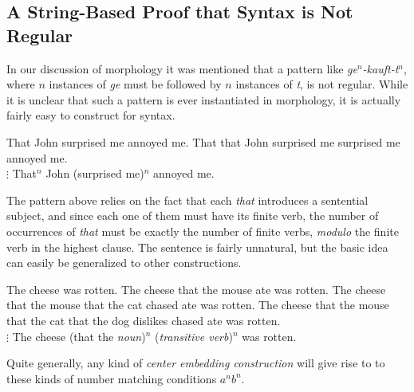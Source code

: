 \subsection{A String-Based Proof that Syntax is Not Regular}
In our discussion of morphology it was mentioned that a pattern like \emph{ge$^n$-kauft-t$^n$}, where $n$ instances of \emph{ge} must be followed by $n$ instances of \emph{t}, is not regular.
While it is unclear that such a pattern is ever instantiated in morphology, it is actually fairly easy to construct for syntax.
%
\begin{exe}
    \ex
    \begin{xlist}
        \ex That John surprised me annoyed me.
        \ex That that John surprised me surprised me annoyed me.\\
        $\vdots$
        \ex That$^n$ John (surprised me)$^n$ annoyed me.
    \end{xlist}
\end{exe}
%
The pattern above relies on the fact that each \emph{that} introduces a sentential subject, and since each one of them must have its finite verb, the number of occurrences of \emph{that} must be exactly the number of finite verbs, \emph{modulo} the finite verb in the highest clause.
The sentence is fairly unnatural, but the basic idea can easily be generalized to other constructions.
%
\begin{exe}
    \ex
    \begin{xlist}
        \ex The cheese was rotten.
        \ex The cheese that the mouse ate was rotten.
        \ex The cheese that the mouse that the cat chased ate was rotten.
        \ex The cheese that the mouse that the cat that the dog dislikes chased ate was rotten.\\
        $\vdots$
        \ex The cheese (that the \emph{noun})$^n$ (\emph{transitive verb})$^n$ was rotten.
    \end{xlist}
\end{exe}
%
Quite generally, any kind of \emph{center embedding construction} will give rise to to these kinds of number matching conditions $a^n b^n$.

